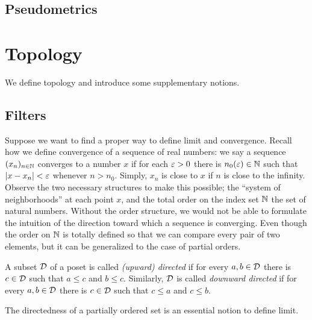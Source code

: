 \documentclass{../crs}
\begin{document}



\subsection{Pseudometrics}






















\section{Topology}
We define topology and introduce some supplementary notions.




\subsection{Filters}
Suppose we want to find a proper way to define limit and convergence.
Recall how we define convergence of a sequence of real numbers: we say a sequence $(x_n)_{n\in\mathbb{N}}$ converges to a number $x$ if for each $\varepsilon>0$ there is $n_0(\varepsilon)\in\mathbb{N}$ such that $|x-x_n|<\varepsilon$ whenever $n>n_0$.
Simply, $x_n$ is close to $x$ if $n$ is close to the infinity.
Observe the two necessary structures to make this possible; the ``system of neighborhoods'' at each point $x$, and the total order on the index set $\mathbb{N}$ the set of natural numbers.
Without the order structure, we would not be able to formulate the intuition of the direction toward which a sequence is converging.
Even though the order on $\mathbb{N}$ is totally defined so that we can compare every pair of two elements, but it can be generalized to the case of partial orders.

\begin{defn}
A subset $\mathcal{D}$ of a poset is called \emph{(upward) directed} if for every $a,b\in\mathcal{D}$ there is $c\in\mathcal{D}$ such that $a\le c$ and $b\le c$.
Similarly, $\mathcal{D}$ is called \emph{downward directed} if for every $a,b\in\mathcal{D}$ there is $c\in\mathcal{D}$ such that $c\le a$ and $c\le b$.
\end{defn}

The directedness of a partially ordered set is an essential notion to define limit.
\end{document}
